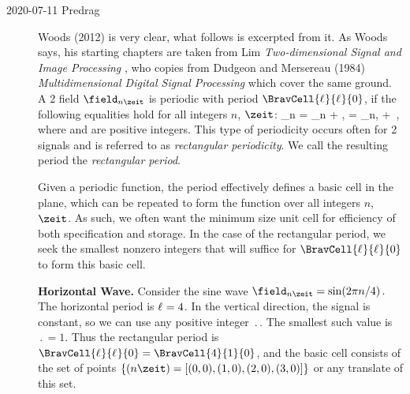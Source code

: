 \begin{description}

\item[2020-07-11 Predrag]
Woods (2012)  is very clear, what follows
is excerpted from it. As Woods says, his starting chapters are taken
from Lim {\em Two-dimensional Signal and Image Processing}
 , who copies from Dudgeon and
Mersereau (1984) {\em Multidimensional Digital Signal
Processing}  which cover the same ground.
\\

A 2{\dmn} field $\field_{n \zeit}$ is periodic with period
$\BravCell{\speriod{}}{\period{}}{0}$, if the
following equalities hold for all integers $n$, $\zeit$:
\beq
\field_{n\zeit} = \field_{n + \speriod{}, \zeit}
                 = \field_{n, \zeit+ \period{}}
\,,
where \speriod{} and \period{} are positive integers.
This type of periodicity occurs often for 2{\dmn} signals and is referred to
as \emph{rectangular periodicity}. We call the resulting period the
\emph{rectangular period}.

Given a periodic function, the period effectively defines a basic cell in
the plane, which can be repeated to form the function over all integers
$n$, $\zeit$. As such, we often want the minimum size unit cell for
efficiency of both specification and storage. In the case of the
rectangular period, we seek the smallest nonzero integers that will
suffice for $\BravCell{\speriod{}}{\period{}}{0}$ to form this basic
cell.

\textbf{Horizontal Wave.}
Consider the sine wave
\(
\field_{n\zeit}  = \sin(2\pi n/4)
\,.
\)
The horizontal period is ${\ell_{}}=4$. In the vertical direction, the
signal is constant, so we can use any positive integer $\period{}$.
The smallest such value is $\period{}=1$. Thus the rectangular period is
$\BravCell{\speriod{}}{\period{}}{0}=\BravCell{4}{1}{0}$,
and the basic cell consists of the set of points
\(
\{({n\zeit}) = [(0,0),(1,0),(2,0),(3,0)]\}
\)
 or any translate of this set.


\end{description}
